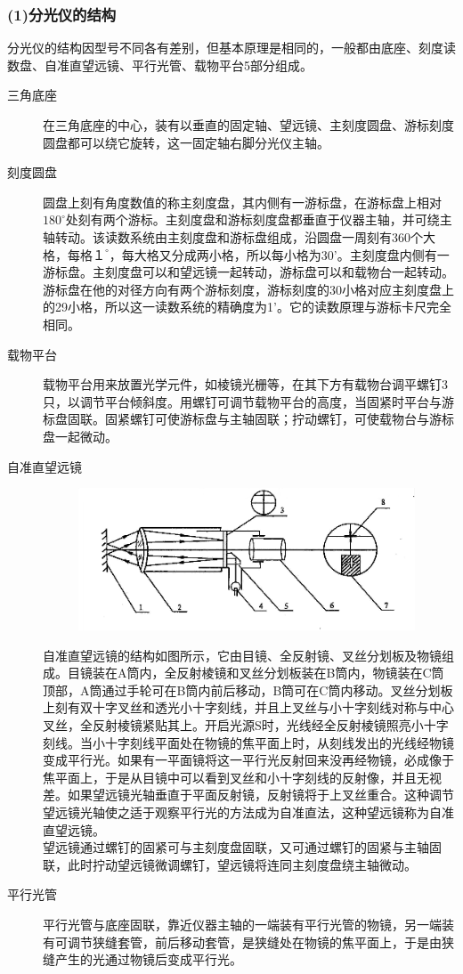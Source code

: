\documentclass[11pt,a4paper,oneside]{article}
\begin{document}
\subsubsection*{(1)分光仪的结构}
分光仪的结构因型号不同各有差别，但基本原理是相同的，一般都由底座、刻度读数盘、自准直望远镜、平行光管、载物平台5部分组成。
\begin{description}
\item[三角底座] 在三角底座的中心，装有以垂直的固定轴、望远镜、主刻度圆盘、游标刻度圆盘都可以绕它旋转，这一固定轴右脚分光仪主轴。
\item[刻度圆盘] 圆盘上刻有角度数值的称主刻度盘，其内侧有一游标盘，在游标盘上相对$180^{\circ}$处刻有两个游标。主刻度盘和游标刻度盘都垂直于仪器主轴，并可绕主轴转动。该读数系统由主刻度盘和游标盘组成，沿圆盘一周刻有360个大格，每格$１^{\circ}$，每大格又分成两小格，所以每小格为30'。主刻度盘内侧有一游标盘。主刻度盘可以和望远镜一起转动，游标盘可以和载物台一起转动。游标盘在他的对径方向有两个游标刻度，游标刻度的30小格对应主刻度盘上的29小格，所以这一读数系统的精确度为1’。它的读数原理与游标卡尺完全相同。
\item[载物平台] 载物平台用来放置光学元件，如棱镜光栅等，在其下方有载物台调平螺钉3只，以调节平台倾斜度。用螺钉可调节载物平台的高度，当固紧时平台与游标盘固联。固紧螺钉可使游标盘与主轴固联；拧动螺钉，可使载物台与游标盘一起微动。
\item[自准直望远镜] 

 \begin{figure}[H]
 \centering
  \includegraphics[width=10cm]{Image/自准直望远镜.png}
\end{figure}


自准直望远镜的结构如图所示，它由目镜、全反射镜、叉丝分划板及物镜组成。目镜装在A筒内，全反射棱镜和叉丝分划板装在B筒内，物镜装在C筒顶部，A筒通过手轮可在B筒内前后移动，B筒可在C筒内移动。叉丝分划板上刻有双十字叉丝和透光小十字刻线，并且上叉丝与小十字刻线对称与中心叉丝，全反射棱镜紧贴其上。开启光源S时，光线经全反射棱镜照亮小十字刻线。当小十字刻线平面处在物镜的焦平面上时，从刻线发出的光线经物镜变成平行光。如果有一平面镜将这一平行光反射回来没再经物镜，必成像于焦平面上，于是从目镜中可以看到叉丝和小十字刻线的反射像，并且无视差。如果望远镜光轴垂直于平面反射镜，反射镜将于上叉丝重合。这种调节望远镜光轴使之适于观察平行光的方法成为自准直法，这种望远镜称为自准直望远镜。\\望远镜通过螺钉的固紧可与主刻度盘固联，又可通过螺钉的固紧与主轴固联，此时拧动望远镜微调螺钉，望远镜将连同主刻度盘绕主轴微动。
\item[平行光管] 平行光管与底座固联，靠近仪器主轴的一端装有平行光管的物镜，另一端装有可调节狭缝套管，前后移动套管，是狭缝处在物镜的焦平面上，于是由狭缝产生的光通过物镜后变成平行光。
\end{description}
\end{document}
